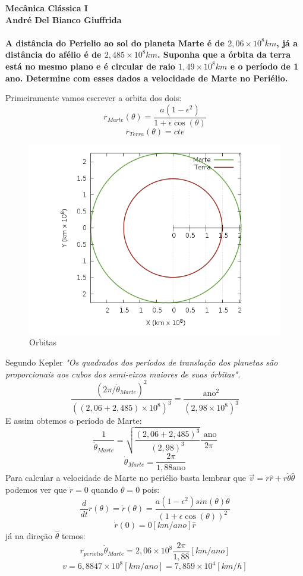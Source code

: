 \documentclass[a4paper,12pt]{exam}
\begin{document}
\begingroup 
	  \bf \Large Mecânica Clássica I\\
	  \indent \normalsize André Del Bianco Giuffrida
	\endgroup
	\\ \quad
	\\
	A distância do Perielio ao sol do planeta Marte é de $2,06\times 10^8 km$, já a distância do afélio é de $2,485 \times 10^8 km$.
	Suponha que a órbita da terra está no mesmo plano e é circular de raio $1,49 \times 10^8 km$ e o período de 1 ano. Determine com esses dados a velocidade de Marte no Periélio.
	
	Primeiramente vamos escrever a orbita dos dois:
	\[ r_{Marte}(\theta) = \frac{a(1-\epsilon^2)}{1+\epsilon\cos{(\theta)}}\]
	\[r_{Terra}(\theta) = cte\]
		\begin{figure}[h]
			\centering
			\includegraphics[scale=0.6]{6o0.png}
			\caption{Orbitas}
		\end{figure}
	
	Segundo Kepler \textit{"Os quadrados dos períodos de translação dos planetas são proporcionais aos cubos dos semi-eixos maiores de suas órbitas".} 
	\[ \frac{(2 \pi / \dot\theta_{Marte})^2}{((2,06 + 2,485)\times 10^8)^3}= \frac{\text{ano}^2}{(2,98 \times 10^8)^3}\]
	E assim obtemos o período de Marte:
	\[\frac{1}{ \dot\theta_{Marte} }= \sqrt{\frac{(2,06 + 2,485)^3}{(2,98)^3} } \frac{\text{ ano}}{2\pi}\]
	\[ \dot\theta_{Marte} = \frac{2\pi}{1,88 \text{ano}}\]
	Para calcular a velocidade de Marte no periélio basta lembrar que $\vec{v} = \dot r \hat r + r\dot\theta \hat\theta$
	podemos ver que $\dot r = 0$ quando $\theta = 0$ pois:
	\[\frac{d}{dt}r(\theta) = \dot r(\theta) = \frac{a(1-\epsilon^2) sin(\theta) \dot\theta}{(1+\epsilon\cos{(\theta)})^2} \]
	\[ \dot r(0) = 0 [km/ano] \hat r\]
	já na direção $\hat \theta$ temos:
	\[ r_{perielio}\dot\theta_{Marte} = 2,06 \times 10^8 \frac{2\pi}{1,88} [km/ano] \]
	\[v = 6,8847 \times 10^8[km/ano] = 7,859 \times 10^{4} [km/h]\]
	
	
		
	
\end{document}
